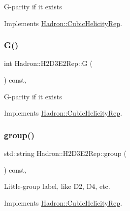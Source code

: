 G-\/parity if it exists 

Implements \mbox{\hyperlink{structHadron_1_1CubicHelicityRep_a50689f42be1e6170aa8cf6ad0597018b}{Hadron\+::\+Cubic\+Helicity\+Rep}}.

\mbox{\label{structHadron_1_1H2D3E2Rep_acf948fba347a3cbb8ca79c0bb60eaf23}} 
\subsubsection{\texorpdfstring{G()}{G()}\hspace{0.1cm}{\footnotesize\ttfamily [2/2]}}
{\footnotesize\ttfamily int Hadron\+::\+H2\+D3\+E2\+Rep\+::G (\begin{DoxyParamCaption}{ }\end{DoxyParamCaption}) const\hspace{0.3cm}{\ttfamily [inline]}, {\ttfamily [virtual]}}

G-\/parity if it exists 

Implements \mbox{\hyperlink{structHadron_1_1CubicHelicityRep_a50689f42be1e6170aa8cf6ad0597018b}{Hadron\+::\+Cubic\+Helicity\+Rep}}.

\mbox{\label{structHadron_1_1H2D3E2Rep_a3a6d6bb478ae6e65c1d31ad244ab4d20}} 
\subsubsection{\texorpdfstring{group()}{group()}\hspace{0.1cm}{\footnotesize\ttfamily [1/3]}}
{\footnotesize\ttfamily std\+::string Hadron\+::\+H2\+D3\+E2\+Rep\+::group (\begin{DoxyParamCaption}{ }\end{DoxyParamCaption}) const\hspace{0.3cm}{\ttfamily [inline]}, {\ttfamily [virtual]}}

Little-\/group label, like D2, D4, etc. 

Implements \mbox{\hyperlink{structHadron_1_1CubicHelicityRep_a101a7d76cd8ccdad0f272db44b766113}{Hadron\+::\+Cubic\+Helicity\+Rep}}.

\mbox{\label{structHadron_1_1H2D3E2Rep_a3a6d6bb478ae6e65c1d31ad244ab4d20}} 
